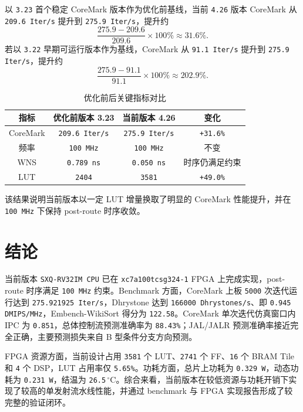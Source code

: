 ﻿\documentclass[UTF8,a4paper,12pt]{ctexart}
\begin{document}
以 \texttt{3.23} 首个稳定 CoreMark 版本作为优化前基线，当前 \texttt{4.26} 版本 CoreMark 从 \texttt{209.6 Iter/s} 提升到 \texttt{275.9 Iter/s}，提升约
\[
    \frac{275.9-209.6}{209.6}\times100\% \approx 31.6\%.
\]
若以 \texttt{3.22} 早期可运行版本作为基线，CoreMark 从 \texttt{91.1 Iter/s} 提升到 \texttt{275.9 Iter/s}，提升约
\[
    \frac{275.9-91.1}{91.1}\times100\% \approx 202.9\%.
\]

\begin{table}[htbp]
    \centering
    \caption{优化前后关键指标对比}
    \begin{tabular}{cccc}
        \toprule
        指标 & 优化前版本 3.23 & 当前版本 4.26 & 变化 \\
        \midrule
        CoreMark & \texttt{209.6 Iter/s} & \texttt{275.9 Iter/s} & \texttt{+31.6\%} \\
        频率 & \texttt{100 MHz} & \texttt{100 MHz} & 不变 \\
        WNS & \texttt{0.789 ns} & \texttt{0.050 ns} & 时序仍满足约束 \\
        LUT & \texttt{2404} & \texttt{3581} & \texttt{+49.0\%} \\
        \bottomrule
    \end{tabular}
\end{table}

该结果说明当前版本以一定 LUT 增量换取了明显的 CoreMark 性能提升，并在 \texttt{100 MHz} 下保持 post-route 时序收敛。

\section{结论}

当前版本 \texttt{SXQ-RV32IM CPU} 已在 \texttt{xc7a100tcsg324-1} FPGA 上完成实现，post-route 时序满足 \texttt{100 MHz} 约束。Benchmark 方面，CoreMark 上板 \texttt{5000} 次迭代运行达到 \texttt{275.921925 Iter/s}，Dhrystone 达到 \texttt{166000 Dhrystones/s}、即 \texttt{0.945 DMIPS/MHz}，Embench-WikiSort 得分为 \texttt{122.58}。CoreMark 单次迭代仿真窗口内 IPC 为 \texttt{0.851}，总体控制流预测准确率为 \texttt{88.43\%}；JAL/JALR 预测准确率接近完全正确，主要预测损失来自 B 型条件分支方向预测。

FPGA 资源方面，当前设计占用 \texttt{3581} 个 LUT、\texttt{2741} 个 FF、\texttt{16} 个 BRAM Tile 和 \texttt{4} 个 DSP，LUT 占用率仅 \texttt{5.65\%}。功耗方面，总片上功耗为 \texttt{0.329 W}，动态功耗为 \texttt{0.231 W}，结温为 \texttt{26.5}$\,^{\circ}\mathrm{C}$。综合来看，当前版本在较低资源与功耗开销下实现了较高的单发射流水线性能，并通过 benchmark 与 FPGA 实现报告形成了较完整的验证闭环。
\end{document}
